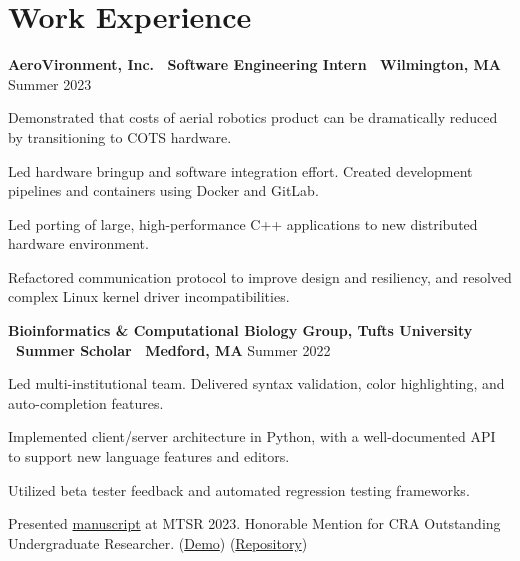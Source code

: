 \documentclass[letter,10pt]{article}
\newenvironment{mylist}[1][]
    {\itemize[nosep, wide=0pt, leftmargin=*, after=\strut]}
    {\enditemize}
\begin{document}

\section{Work Experience}
\begin{minipage}[t]{\linewidth}
    \textbf{AeroVironment, Inc. \textbar \ Software Engineering Intern \textbar \ Wilmington, MA} \hfill Summer 2023 
    \begin{mylist}
        \item Demonstrated that costs of aerial robotics product can be dramatically reduced by transitioning to COTS hardware. 
        \item Led hardware bringup and software integration effort. Created development pipelines and containers using Docker and GitLab. 
        \item Led porting of large, high-performance C++ applications to new distributed hardware environment. 
        \item Refactored communication protocol to improve design and resiliency, and resolved complex Linux kernel driver incompatibilities.
    \end{mylist}
\end{minipage}


\begin{minipage}[t]{\linewidth}
    \textbf{Bioinformatics \& Computational Biology Group, Tufts University \textbar \ Summer Scholar \textbar \ Medford, MA} \hfill Summer 2022
    \begin{mylist}
        \item Led multi-institutional team. Delivered syntax validation, color highlighting, and auto-completion features.
        \item Implemented client/server architecture in Python, with a well-documented API to support new language features and editors. 
        \item Utilized beta tester feedback and automated regression testing frameworks.
        \item Presented \href{https://www.eecs.tufts.edu/~lstran01/files/context-sensitive.pdf}{manuscript} at MTSR 2023. Honorable Mention for CRA Outstanding Undergraduate Researcher. (\href{https://youtu.be/TFLdXxnaBlU}{Demo}) (\href{https://github.com/liam-strand/medford-language-server}{Repository})
    \end{mylist}
\end{minipage}
\end{document}
